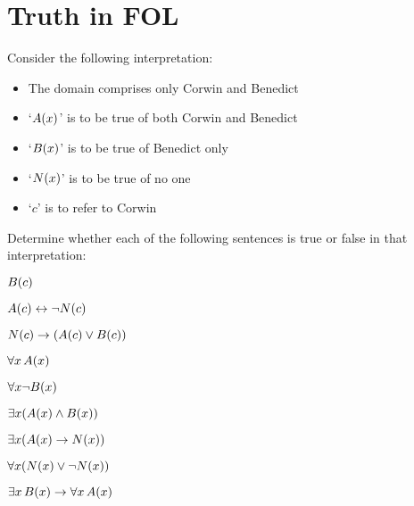 

\chapter{Truth in FOL}\setcounter{ProbPart}{0}
\problempart
\label{pr.TorF1}
Consider the following interpretation:
	\begin{itemize}
		\item The domain comprises only Corwin and Benedict
		\item `$\mathord{A}(x)$' is to be true of both Corwin and Benedict
		\item `$\mathord{B}(x)$' is to be true of Benedict only
		\item `$\mathord{N}(x)$' is to be true of no one
		\item `$c$' is to refer to Corwin
	\end{itemize}
Determine whether each of the following sentences is true or false in that interpretation:
\begin{compactlist}
\item $\mathord{B}(c)$ \hfill {}
\item $\mathord{A}(c) \leftrightarrow \neg \mathord{N}(c)$ \hfill {}
\item $\mathord{N}(c) \rightarrow (\mathord{A}(c) \vee \mathord{B}(c))$ \hfill {}
\item $\forall x\,\mathord{A}(x)$ \hfill {}
\item $\forall x \neg \mathord{B}(x)$ \hfill {}
\item $\exists x(\mathord{A}(x) \wedge \mathord{B}(x))$ \hfill {}
\item $\exists x(\mathord{A}(x) \rightarrow \mathord{N}(x))$ \hfill {}
\item $\forall x(\mathord{N}(x) \vee \neg \mathord{N}(x))$ \hfill {}
\item $\exists x\,\mathord{B}(x) \rightarrow \forall x\,\mathord{A}(x)$ \hfill {}
\end{compactlist}

